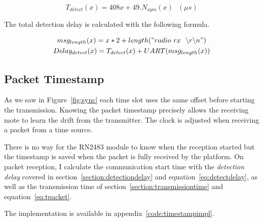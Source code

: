 \begin{equation}
  \label{eq:detectcomp}
  T_{detect}(x) = 408x + 49 . N_{sym}(x) \ \ \ (\mu s)
\end{equation}

The total detection delay is calculated with the following formula.

\begin{gather}
  msg_{length}(x) = x * 2 + length("radio~rx~~\backslash r \backslash n") \\
  \label{eq:detectdelay}
  Delay_{detect}(x) = T_{detect}(x) + UART(msg_{length}(x))
\end{gather}

\subsection{Packet Timestamp}

As we saw in Figure~\ref{fig:sync} each time slot uses the same offset before 
starting the transmission.
Knowing the packet timestamp precisely allows the receiving mote to learn the
drift from the transmitter. 
The clock is adjusted when receiving a packet from a time source.

There is no way for the RN2483 module to know when the reception started but
the timestamp is saved when the packet is fully received by the platform.
On packet reception, I calculate the communication start time with the 
\emph{detection delay} covered in section~\ref{section:detectiondelay} and
equation~\ref{eq:detectdelay}, as well as the transmission time of
section~\ref{section:transmissiontime} and equation~\ref{eq:tpacket}.

The implementation is available in appendix~\ref{code:timestampimpl}.




